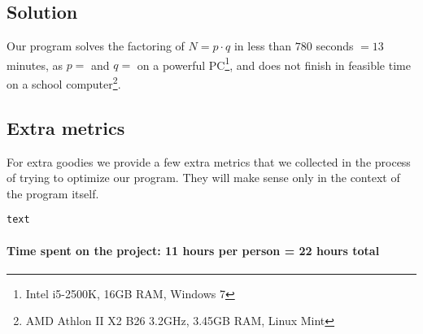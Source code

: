 \documentclass[a4paper,titlepage]{article}
\begin{document}
\subsection*{Solution}
Our program solves the factoring of $N = p\cdot q$ in less than $780$ seconds $= 13$ minutes, as $p = $ and $q = $ on a powerful PC\footnote{Intel i5-2500K, 16GB RAM, Windows 7}, and does not finish in feasible time on a school computer\footnote{AMD Athlon II X2 B26 3.2GHz, 3.45GB RAM, Linux Mint}.

\subsection*{Extra metrics}
For extra goodies we provide a few extra metrics that we collected in the process of trying to optimize our program. They will make sense only in the context of the program itself.

\begin{verbatim}
text
\end{verbatim}

\vspace*{2cm}
\paragraph{Time spent on the project: 11 hours per person = 22 hours total}
\end{document}
